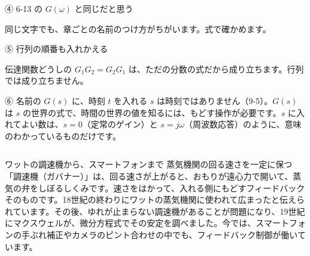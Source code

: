 \begingroup{}%
\noindent\begin{minipage}[t]{0.485\linewidth}\vspace{0pt}
\begin{tsumazuki}{④ 6-13 の $G(\omega)$ と同じだと思う}
\raggedright{}
同じ文字でも、章ごとの名前のつけ方がちがいます。式で確かめます。
\end{tsumazuki}
\end{minipage}\hfill
\begin{minipage}[t]{0.485\linewidth}\vspace{0pt}
\begin{tsumazuki}{⑤ 行列の順番も入れかえる}
\raggedright{}
伝達関数どうしの $G_1G_2=G_2G_1$ は、ただの分数の式だから成り立ちます。行列では成り立ちません。
\end{tsumazuki}
\end{minipage}\par
\endgroup

\begin{tsumazuki}{⑥ 名前の $G(s)$ に、時刻 $t$ を入れる}
$s$ は時刻ではありません（9-5）。$G(s)$ は $s$ の世界の式で、時間の世界の値を知るには、もどす操作が必要です。$s$ に入れてよい数は、$s=0$（定常のゲイン）と $s=j\omega$（周波数応答）のように、意味のわかっているものだけです。
\end{tsumazuki}

\begin{column}{ワットの調速機から、スマートフォンまで}
蒸気機関の回る速さを一定に保つ「調速機（ガバナー）」は、回る速さが上がると、おもりが遠心力で開いて、蒸気の弁をしぼるしくみです。速さをはかって、入れる側にもどすフィードバックそのものです。18世紀の終わりにワットの蒸気機関に使われて広まったと伝えられています。その後、ゆれが止まらない調速機があることが問題になり、19世紀にマクスウェルが、微分方程式でその安定を調べました。今では、スマートフォンの手ぶれ補正やカメラのピント合わせの中でも、フィードバック制御が働いています。
\end{column}

